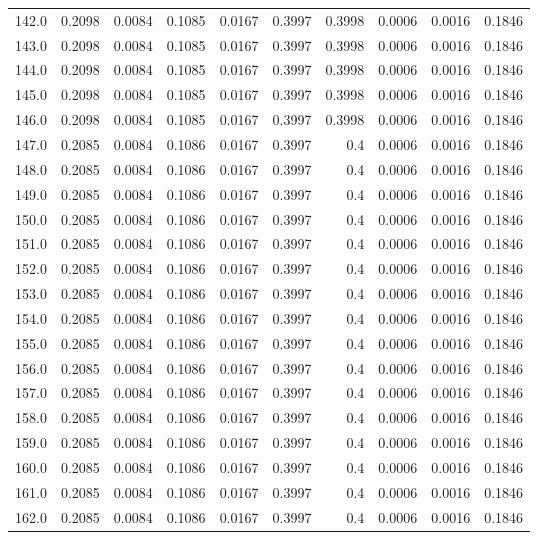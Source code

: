 \begin{longtable}{lrrrrrrrrr}
142.0 & 0.2098 & 0.0084 & 0.1085 & 0.0167 & 0.3997 & 0.3998 & 0.0006 & 0.0016 & 0.1846 \\
143.0 & 0.2098 & 0.0084 & 0.1085 & 0.0167 & 0.3997 & 0.3998 & 0.0006 & 0.0016 & 0.1846 \\
144.0 & 0.2098 & 0.0084 & 0.1085 & 0.0167 & 0.3997 & 0.3998 & 0.0006 & 0.0016 & 0.1846 \\
145.0 & 0.2098 & 0.0084 & 0.1085 & 0.0167 & 0.3997 & 0.3998 & 0.0006 & 0.0016 & 0.1846 \\
146.0 & 0.2098 & 0.0084 & 0.1085 & 0.0167 & 0.3997 & 0.3998 & 0.0006 & 0.0016 & 0.1846 \\
147.0 & 0.2085 & 0.0084 & 0.1086 & 0.0167 & 0.3997 & 0.4 & 0.0006 & 0.0016 & 0.1846 \\
148.0 & 0.2085 & 0.0084 & 0.1086 & 0.0167 & 0.3997 & 0.4 & 0.0006 & 0.0016 & 0.1846 \\
149.0 & 0.2085 & 0.0084 & 0.1086 & 0.0167 & 0.3997 & 0.4 & 0.0006 & 0.0016 & 0.1846 \\
150.0 & 0.2085 & 0.0084 & 0.1086 & 0.0167 & 0.3997 & 0.4 & 0.0006 & 0.0016 & 0.1846 \\
151.0 & 0.2085 & 0.0084 & 0.1086 & 0.0167 & 0.3997 & 0.4 & 0.0006 & 0.0016 & 0.1846 \\
152.0 & 0.2085 & 0.0084 & 0.1086 & 0.0167 & 0.3997 & 0.4 & 0.0006 & 0.0016 & 0.1846 \\
153.0 & 0.2085 & 0.0084 & 0.1086 & 0.0167 & 0.3997 & 0.4 & 0.0006 & 0.0016 & 0.1846 \\
154.0 & 0.2085 & 0.0084 & 0.1086 & 0.0167 & 0.3997 & 0.4 & 0.0006 & 0.0016 & 0.1846 \\
155.0 & 0.2085 & 0.0084 & 0.1086 & 0.0167 & 0.3997 & 0.4 & 0.0006 & 0.0016 & 0.1846 \\
156.0 & 0.2085 & 0.0084 & 0.1086 & 0.0167 & 0.3997 & 0.4 & 0.0006 & 0.0016 & 0.1846 \\
157.0 & 0.2085 & 0.0084 & 0.1086 & 0.0167 & 0.3997 & 0.4 & 0.0006 & 0.0016 & 0.1846 \\
158.0 & 0.2085 & 0.0084 & 0.1086 & 0.0167 & 0.3997 & 0.4 & 0.0006 & 0.0016 & 0.1846 \\
159.0 & 0.2085 & 0.0084 & 0.1086 & 0.0167 & 0.3997 & 0.4 & 0.0006 & 0.0016 & 0.1846 \\
160.0 & 0.2085 & 0.0084 & 0.1086 & 0.0167 & 0.3997 & 0.4 & 0.0006 & 0.0016 & 0.1846 \\
161.0 & 0.2085 & 0.0084 & 0.1086 & 0.0167 & 0.3997 & 0.4 & 0.0006 & 0.0016 & 0.1846 \\
162.0 & 0.2085 & 0.0084 & 0.1086 & 0.0167 & 0.3997 & 0.4 & 0.0006 & 0.0016 & 0.1846 \\

\end{longtable}
